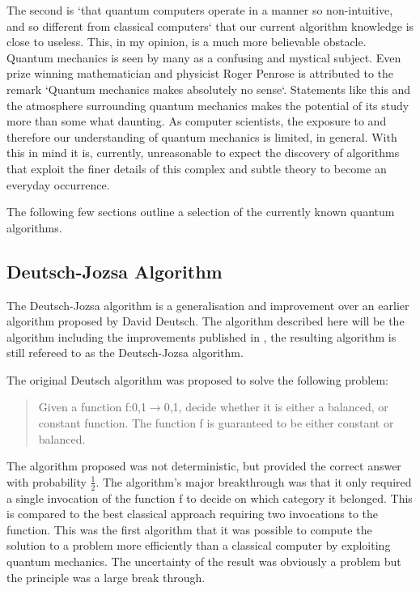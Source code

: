 \documentclass[authoryearcitations]{UoYCSproject}
\begin{document}
The second is `that quantum computers operate in a manner so non-intuitive, and so different from classical computers`\cite{Shor:2004:PQA:1032132.1032149} that our current algorithm knowledge is close to useless.
This, in my opinion, is a much more believable obstacle.
Quantum mechanics is seen by many as a confusing and mystical subject.
Even prize winning mathematician and physicist Roger Penrose is attributed to the remark `Quantum mechanics makes absolutely no sense`.
Statements like this and the atmosphere surrounding quantum mechanics makes the potential of its study more than some what daunting.
As computer scientists, the exposure to and therefore our understanding of quantum mechanics is limited, in general.
With this in mind it is, currently, unreasonable to expect the discovery of algorithms that exploit the finer details of this complex and subtle theory to become an everyday occurrence.

The following few sections outline a selection of the currently known quantum algorithms.

\subsection{Deutsch-Jozsa Algorithm}
The Deutsch-Jozsa algorithm\cite{1992-deutsch} is a generalisation and improvement over an earlier algorithm proposed by David Deutsch\cite{Deutsch1985}.
The algorithm described here will be the algorithm including the improvements published in \cite{Macchiavello97quantumalgorithms}, the resulting algorithm is still refereed to as the Deutsch-Jozsa algorithm.

The original Deutsch algorithm\cite{Deutsch1985} was proposed to solve the following problem:
\begin{quote}
Given a function f:{0,1}$\to${0,1}, decide whether it is either a balanced, or constant function.
The function f is guaranteed to be either constant or balanced.
\end{quote}
The algorithm proposed was not deterministic, but provided the correct answer with probability $\frac{1}{2}$.
The algorithm's major breakthrough was that it only required a single invocation of the function f to decide on which category it belonged.
This is compared to the best classical approach requiring two invocations to the function.
This was the first algorithm that it was possible to compute the solution to a problem more efficiently than a classical computer by exploiting quantum mechanics.
The uncertainty of the result was obviously a problem but the principle was a large break through.
\end{document}
